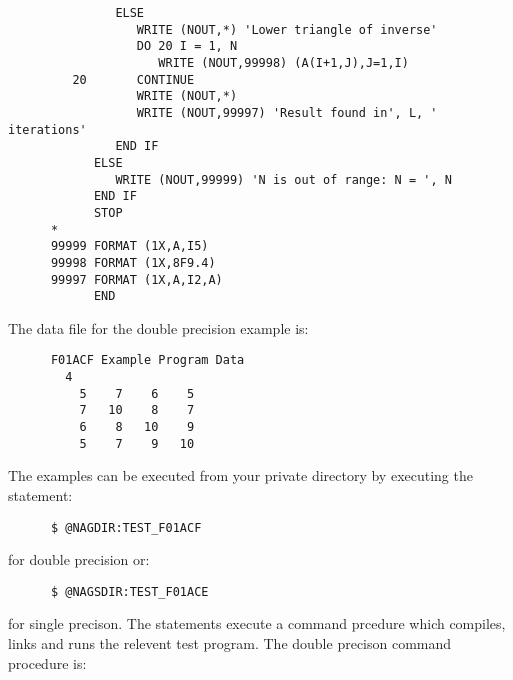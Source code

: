 \begin{small}
\begin{verbatim}
               ELSE                                                          
                  WRITE (NOUT,*) 'Lower triangle of inverse'                 
                  DO 20 I = 1, N                                             
                     WRITE (NOUT,99998) (A(I+1,J),J=1,I)                     
         20       CONTINUE                                                   
                  WRITE (NOUT,*)                                             
                  WRITE (NOUT,99997) 'Result found in', L, ' iterations'     
               END IF                                                        
            ELSE                                                             
               WRITE (NOUT,99999) 'N is out of range: N = ', N               
            END IF                                                           
            STOP                                                             
      *                                                                      
      99999 FORMAT (1X,A,I5)                                                 
      99998 FORMAT (1X,8F9.4)                                                
      99997 FORMAT (1X,A,I2,A)                                               
            END                                                              
\end{verbatim} 
\end{small}

The data file for the double precision example is:

\begin{small}
\begin{verbatim} 
      F01ACF Example Program Data 
        4                        
          5    7    6    5       
          7   10    8    7       
          6    8   10    9       
          5    7    9   10                            
\end{verbatim} 
\end{small}

The examples can be executed from your private directory by executing the
statement:
\begin{verbatim} 
      $ @NAGDIR:TEST_F01ACF
\end{verbatim} 
for double precision or:
\begin{verbatim} 
      $ @NAGSDIR:TEST_F01ACE
\end{verbatim} 
for single precison. The statements execute a command prcedure which compiles,
links and runs the relevent test program. The double precison command procedure
is:

